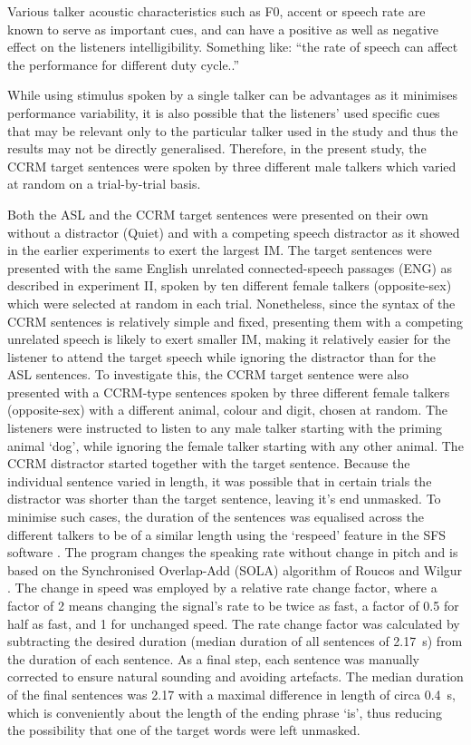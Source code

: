 \documentclass[a4paper, twoside]{templates/ociamthesis}
\begin{document}
Various talker acoustic characteristics such as F0, accent or speech rate are known to serve as important cues, and can have a positive as well as negative effect on the listeners intelligibility. Something like: ``the rate of speech can affect the performance for different duty cycle..''

While using stimulus spoken by a single talker can be advantages as it minimises performance variability, it is also possible that the listeners' used specific cues that may be relevant only to the particular talker used in the study and thus the results may not be directly generalised. Therefore, in the present study, the CCRM target sentences were spoken by three different male talkers which varied at random on a trial-by-trial basis.

Both the ASL and the CCRM target sentences were presented on their own without a distractor (Quiet) and with a competing speech distractor as it showed in the earlier experiments to exert the largest IM. The target sentences were presented with the same English unrelated connected-speech passages (ENG) as described in experiment II, spoken by ten different female talkers (opposite-sex) which were selected at random in each trial. Nonetheless, since the syntax of the CCRM sentences is relatively simple and fixed, presenting them with a competing unrelated speech is likely to exert smaller IM, making it relatively easier for the listener to attend the target speech while ignoring the distractor than for the ASL sentences. To investigate this, the CCRM target sentence were also presented with a CCRM-type sentences spoken by three different female talkers (opposite-sex) with a different animal, colour and digit, chosen at random. The listeners were instructed to listen to any male talker starting with the priming animal `dog', while ignoring the female talker starting with any other animal. The CCRM distractor started together with the target sentence. Because the individual sentence varied in length, it was possible that in certain trials the distractor was shorter than the target sentence, leaving it's end unmasked. To minimise such cases, the duration of the sentences was equalised across the different talkers to be of a similar length using the `respeed' feature in the SFS software \autocite[version: SFSWin 1.9][]{SFS}. The program changes the speaking rate without change in pitch and is based on the Synchronised Overlap-Add (SOLA) algorithm of Roucos and Wilgur \autocite{Roucos1986}. The change in speed was employed by a relative rate change factor, where a factor of 2 means changing the signal's rate to be twice as fast, a factor of 0.5 for half as fast, and 1 for unchanged speed. The rate change factor was calculated by subtracting the desired duration (median duration of all sentences of 2.17~s) from the duration of each sentence. As a final step, each sentence was manually corrected to ensure natural sounding and avoiding artefacts. The median duration of the final sentences was 2.17 with a maximal difference in length of circa 0.4~s, which is conveniently about the length of the ending phrase `is', thus reducing the possibility that one of the target words were left unmasked.\\
\end{document}
